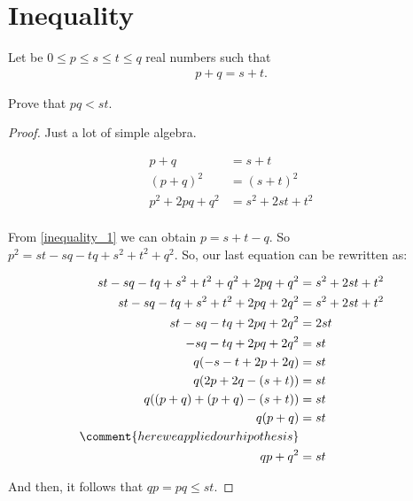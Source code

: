 ﻿\chapter{Inequality}

    \begin{theorem}
        Let be $0 \leq p \leq s \leq t \leq q$ real numbers such that
        \begin{align}\label{inequality_1}
            p + q = s + t.
        \end{align}
        
        Prove that $pq < st$.
    \end{theorem}
    
    \begin{proof}
        Just a lot of simple algebra.
        
        \begin{align}
            p + q               &=      s + t                   \\
            (p + q)^2           &=      (s + t)^2               \\
            p^2 + 2pq + q^2     &=      s^2 + 2st + t^2         \\
        \end{align}
        
        From \eqref{inequality_1} we can obtain $p = s + t - q$. So
        $p^2 = st - sq - tq + s^2 + t^2 + q^2$. So, our last equation can
        be rewritten as:
        
        \begin{align}
            st - sq - tq + s^2 + t^2 + q^2 + 2pq + q^2      &=      s^2 + 2st + t^2         \\         
            st - sq - tq + s^2 + t^2 + 2pq + 2q^2           &=      s^2 + 2st + t^2         \\         
            st - sq - tq + 2pq + 2q^2                       &=      2st                     \\         
            - sq - tq + 2pq + 2q^2                          &=      st                      \\         
            q (- s - t + 2p + 2q)                           &=      st                      \\         
            q (2p + 2q - (s + t))                           &=      st                      \\         
            q ((p + q) + (p + q) - (s + t))                 &=      st                      \\         
            q (p + q)                                       &=      st                      \\
            \comment{here we applied our hipothesis}        &                               \\                    
            qp + q^2                                        &=      st                      \\
        \end{align}
        
        And then, it follows that $qp = pq \leq st$.
    \end{proof}
    
